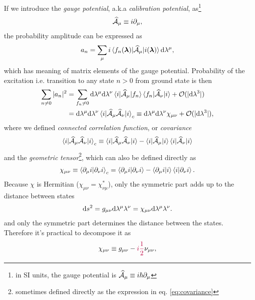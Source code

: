 If we introduce the \emph{gauge potential}, a.k.a \emph{calibration potential}, as\footnote{in SI units, the gauge potential is $\AA_\mu\equiv i\hbar\partial_{\mu}$}
\begin{equation}
    \AA_\mu\equiv i\partial_{\mu},
\end{equation}
the probability amplitude can be expressed as
\begin{equation}
   a_n=\sum_\mu i\braket{f_n(\llambda)|\AA_\mu |i(\llambda)}\d\lambda^\mu,
\end{equation}
which has meaning of matrix elements of the gauge potential. Probability of the excitation i.e. transition to any state $n>0$ from ground state is then
\begin{equation}
    \begin{split}
        \sum_{n\neq 0}|a_n|^2&=  \sum_{f_n\neq 0} \d \lambda^\mu \d \lambda^\nu\braket{i|\AA_\mu|f_n}\braket{f_n|\AA_\nu|i}+\O(|\d \lambda^3|) \\
        &= \d \lambda^\mu \d \lambda^\nu\braket{i|\AA_\mu \AA_\nu|i}_c\equiv \d \lambda^\mu \d \lambda^\nu\chi_{\mu\nu}+\O(|\d \lambda^3|),
    \end{split}
\end{equation}
where we defined \emph{connected correlation function}, or \emph{covariance}
\begin{equation}
    \braket{i|\AA_\mu\AA_\nu|i}_c\equiv \braket{i|\AA_\mu\AA_\nu|i} - \braket{i|\AA_\mu|i}\braket{i|\AA_\nu|i}
    \label{eq:covariance}
\end{equation}
and the \emph{geometric tensor}\footnote{sometimes defined directly as the expression in eq. \ref{eq:covariance}}, which can also be defined directly as
\begin{equation}
    \chi_{\mu\nu}\equiv \braket{\partial_\mu i|\partial_\nu i}_c = \braket{\partial_\mu i|\partial_\nu i} - \braket{\partial_\mu i|i}\braket{i|\partial_\nu i}.
\end{equation}
Because $\chi$ is Hermitian ($\chi_{\mu\nu}=\chi^*_{\nu\mu}$), only the symmetric part adds up to the distance between states 
\begin{equation}
    \d s^2= g_{\mu\nu}\d \lambda^\mu \lambda^\nu= \chi_{\mu\nu}\d \lambda^\mu \lambda^\nu.
\end{equation}
 and only the symmetric part determines the distance between the states. Therefore it's practical to decompose it as
\begin{equation}
    \chi_{\mu\nu} \equiv g_{\mu\nu} - \textcolor{purple}{i\frac{1}{2}} \nu_{\mu\nu},
\end{equation}
